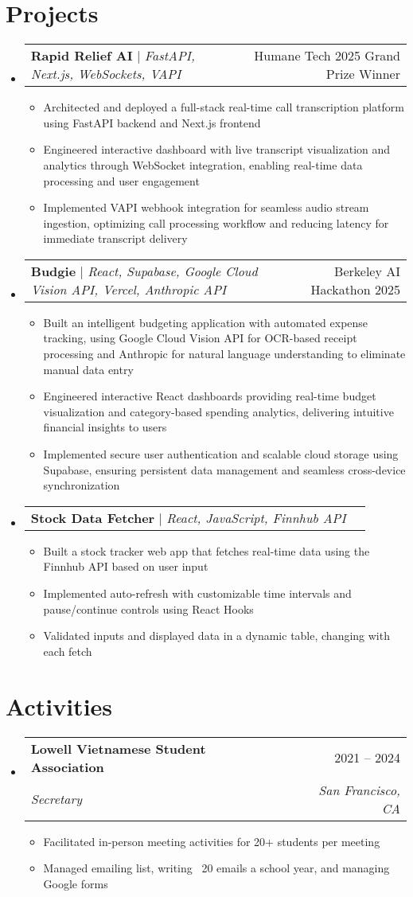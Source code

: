 \documentclass[letterpaper,11pt]{article}
\makeatletter
\newcommand{\resumeItem}[1]{
  \item\small{
    {#1 \vspace{-2pt}}
  }
}
\newcommand{\resumeSubheading}[4]{
  \vspace{-2pt}\item
    \begin{tabular*}{0.97\textwidth}[t]{l@{\extracolsep{\fill}}r}
      \textbf{#1} & #2 \\
      \textit{\small#3} & \textit{\small #4} \\
    \end{tabular*}\vspace{-7pt}
}
\newcommand{\resumeProjectHeading}[2]{
    \item
    \begin{tabular*}{0.97\textwidth}{l@{\extracolsep{\fill}}r}
      \small#1 & #2 \\
    \end{tabular*}\vspace{-7pt}
}
\newcommand{\resumeSubHeadingListStart}{\begin{itemize}[leftmargin=0.15in, label={}]}
\newcommand{\resumeSubHeadingListEnd}{\end{itemize}}
\newcommand{\resumeItemListStart}{\begin{itemize}}
\newcommand{\resumeItemListEnd}{\end{itemize}\vspace{-5pt}}
\makeatother
\begin{document}
\section{Projects}
    \resumeSubHeadingListStart
      \resumeProjectHeading
          {\textbf{Rapid Relief AI} $|$ \emph{FastAPI, Next.js, WebSockets, VAPI}}{Humane Tech 2025 Grand Prize Winner}
          \resumeItemListStart
            \resumeItem{Architected and deployed a full-stack real-time call transcription platform using FastAPI backend and Next.js frontend}
            \resumeItem{Engineered interactive dashboard with live transcript visualization and analytics through WebSocket integration, enabling real-time data processing and user engagement}
            \resumeItem{Implemented VAPI webhook integration for seamless audio stream ingestion, optimizing call processing workflow and reducing latency for immediate transcript delivery}
          \resumeItemListEnd
      \resumeProjectHeading
          {\textbf{Budgie} $|$ \emph{React, Supabase, Google Cloud Vision API, Vercel, Anthropic API}}{Berkeley AI Hackathon 2025}
          \resumeItemListStart
            \resumeItem{Built an intelligent budgeting application with automated expense tracking, using Google Cloud Vision API for OCR-based receipt processing and Anthropic for natural language understanding to eliminate manual data entry}
            \resumeItem{Engineered interactive React dashboards providing real-time budget visualization and category-based spending analytics, delivering intuitive financial insights to users}
            \resumeItem{Implemented secure user authentication and scalable cloud storage using Supabase, ensuring persistent data management and seamless cross-device synchronization}
          \resumeItemListEnd
      \resumeProjectHeading
          {\textbf{Stock Data Fetcher} $|$ \emph{React, JavaScript, Finnhub API}}{}
          \resumeItemListStart
            \resumeItem{Built a stock tracker web app that fetches real-time data using the Finnhub API based on user input}
            \resumeItem{Implemented auto-refresh with customizable time intervals and pause/continue controls using React Hooks}
            \resumeItem{Validated inputs and displayed data in a dynamic table, changing with each fetch}
          \resumeItemListEnd
    \resumeSubHeadingListEnd


\section{Activities}
  \resumeSubHeadingListStart
    \resumeSubheading
      {Lowell Vietnamese Student Association}{2021 -- 2024}
      {Secretary}{San Francisco, CA}
      \resumeItemListStart
        \resumeItem{Facilitated in-person meeting activities for 20+ students per meeting}
        \resumeItem{Managed emailing list, writing ~20 emails a school year, and managing Google forms}
      \resumeItemListEnd
  \resumeSubHeadingListEnd
\end{document}
